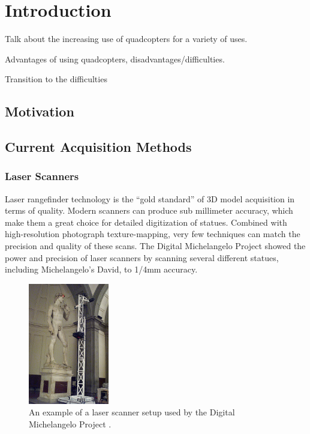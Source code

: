
\chapter{Introduction\label{ch:intro}}

Talk about the increasing use of quadcopters for a variety of uses.

Advantages of using quadcopters, disadvantages/difficulties.

Transition to the difficulties 

\section{Motivation}

\section{Current Acquisition Methods}

\subsection{Laser Scanners}
Laser rangefinder technology is the ``gold standard'' of 3D model acquisition in terms of quality. Modern scanners can produce sub millimeter accuracy, which make them a great choice for detailed digitization of statues. Combined with high-resolution photograph texture-mapping, very few techniques can match the precision and quality of these scans. The Digital Michelangelo Project showed the power and precision of laser scanners by scanning several different statues, including Michelangelo's David, to 1/4mm accuracy.\cite{Levoy}

\begin{figure}
\centering
\includegraphics[height=200px]{../images/david_scan.jpg}
\caption{An example of a laser scanner setup used by the Digital Michelangelo Project \cite{Levoy}.}
\end{figure}

